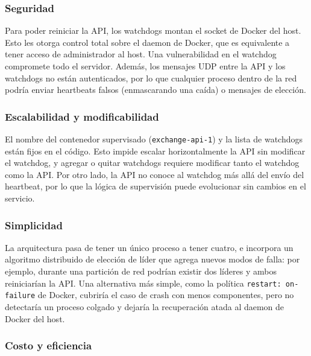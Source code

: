         \subsubsection{Seguridad}
        \label{sec:propuesta_2_seguridad}

        Para poder reiniciar la API, los watchdogs montan el socket de Docker del host. Esto les otorga control total sobre
        el daemon de Docker, que es equivalente a tener acceso de administrador al host. Una vulnerabilidad en el watchdog
        compromete todo el servidor. Además, los mensajes UDP entre la API y los watchdogs no están autenticados, por lo que
        cualquier proceso dentro de la red podría enviar heartbeats falsos (enmascarando una caída) o mensajes de elección.

        \subsubsection{Escalabilidad y modificabilidad}
        \label{sec:propuesta_2_escalabilidad_y_modificabilidad}

        El nombre del contenedor supervisado (\texttt{exchange-api-1}) y la lista de watchdogs están fijos en el código. Esto
        impide escalar horizontalmente la API sin modificar el watchdog, y agregar o quitar watchdogs requiere modificar tanto
        el watchdog como la API. Por otro lado, la API no conoce al watchdog más allá del envío del heartbeat, por lo que la
        lógica de supervisión puede evolucionar sin cambios en el servicio.

        \subsubsection{Simplicidad}
        \label{sec:propuesta_2_simplicidad}

        La arquitectura pasa de tener un único proceso a tener cuatro, e incorpora un algoritmo distribuido de
        elección de líder que agrega nuevos modos de falla: por ejemplo, durante una partición de red podrían existir dos
        líderes y ambos reiniciarían la API. Una alternativa más simple, como la política \texttt{restart: on-failure} de Docker,
        cubriría el caso de crash con menos componentes, pero no detectaría un proceso colgado y dejaría la recuperación atada
        al daemon de Docker del host.

        \subsubsection{Costo y eficiencia}
        \label{sec:propuesta_2_costo_y_eficiencia}

